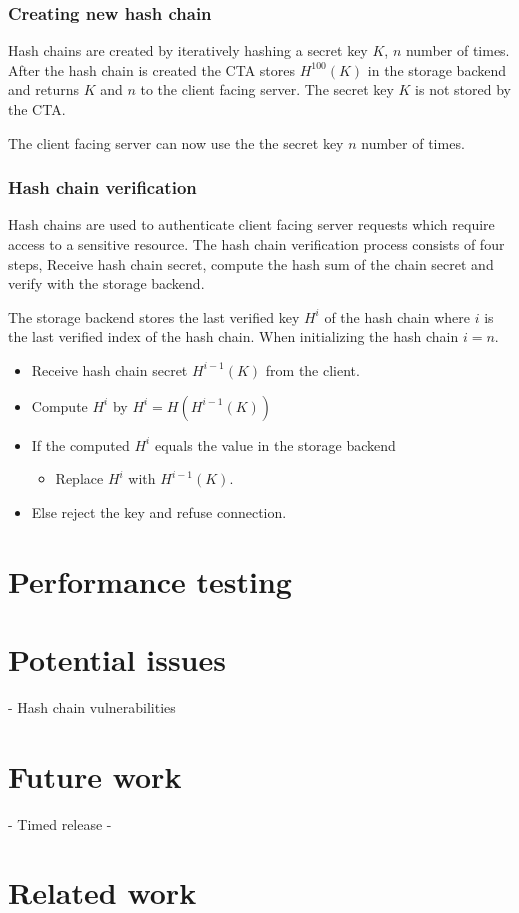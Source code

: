 \documentclass[12pt,conference]{IEEEtran}
\begin{document}
\subsubsection*{Creating new hash chain}
Hash chains are created by iteratively hashing a secret key $K$, $n$ number of times. 
After the hash chain is created the CTA stores $H^{100}(K)$ in the storage backend and returns $K$ and $n$ to the client facing server. The secret key $K$ is not stored by the CTA.

The client facing server can now use the the secret key $n$ number of times.

\subsubsection*{Hash chain verification}
Hash chains are used to authenticate client facing server requests which require access to a sensitive resource. The hash chain verification process consists of four steps, Receive hash chain secret, compute the hash sum of the chain secret and verify with the storage backend.

The storage backend stores the last verified key $H^{i}$ of the hash chain where $i$ is the last verified index of the hash chain. When initializing the hash chain $i = n$. 

\begin{itemize}
\item Receive hash chain secret $H^{i-1}(K)$ from the client.
\item Compute $H^{i}$ by $H^{i} = H(H^{i-1}(K))$

\item If the computed $H^{i}$ equals the value in the storage backend
\begin{itemize}
\item Replace $H^{i}$ with $H^{i-1}(K)$.
\end{itemize}
\item Else reject the key and refuse connection.
\end{itemize}

\section*{Performance testing}

\section*{Potential issues}
- Hash chain vulnerabilities \cite{lee_hash_2007}

\section*{Future work}

- Timed release \cite{chalkias_timed_2006}
- 

\section*{Related work}





\end{document}
